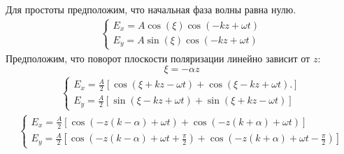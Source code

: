 \documentclass[a5paper,14pt]{article}
\begin{document}
	Для простоты предположим, что начальная фаза волны равна нулю.
	\begin{gather*}
		\begin{cases} 
			E_x = A\cos(\xi)\cos\left(-kz+\omega t\right) \\
			E_y = A\sin(\xi)\cos\left(-kz+\omega t\right)
		\end{cases}
	\end{gather*}
	Предположим, что поворот плоскости поляризации линейно зависит от $z$:
	\begin{equation*}
		\xi=-\alpha z
	\end{equation*}
	\begin{gather*}
		\begin{cases} 
			E_x = \frac{A}{2}\left[
				\cos\left(
					\xi+kz-\omega t
				\right)+
				\cos\left(
					\xi-kz+\omega t
					\right)
			.\right] \\
			E_y = \frac{A}{2}\left[
				\sin\left(
					\xi-kz+\omega t
				\right)+
				\sin\left(
					\xi+kz-\omega t
					\right)
			\right]
		\end{cases}
	\end{gather*}
	\begin{gather*}
		\begin{cases} 
			E_x = \frac{A}{2}\left[
				\cos\left(
					-z(k-\alpha)+\omega t
				\right)+
				\cos\left(
					-z(k+\alpha)+\omega t
					\right)
			\right] \\
			E_y = \frac{A}{2}\left[
				\cos\left(
					-z(k-\alpha)+\omega t+\frac{\pi}{2}
				\right)+
				\cos\left(
					-z(k+\alpha)+\omega t-\frac{\pi}{2}
					\right)
			\right]
		\end{cases}
	\end{gather*}
\end{document}
